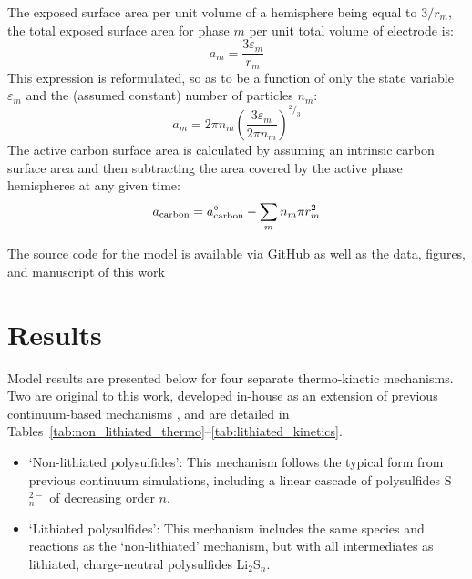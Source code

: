 \documentclass{elsarticle}
\begin{document}
The exposed surface area per unit volume of a hemisphere being equal to $3/r_m$, the total exposed surface area for phase $m$ per unit total volume of electrode is:
\begin{equation}\label{eq:area_per_vol_m_1}
    a_m = \frac{3\varepsilon_m}{r_m}
\end{equation}
This expression is reformulated, so as to be a function of only the state variable $\varepsilon_m$ and the (assumed constant) number of particles $n_m$:
\begin{equation}\label{eq:area_per_vol_m_2}
    a_m = 2\pi n_m\left(\frac{3\varepsilon_m}{2\pi n_m}\right)^{^2/_3}
\end{equation}
The active carbon surface area is calculated by assuming an intrinsic carbon surface area and then subtracting the area covered by the active phase hemispheres at any given time:
\begin{equation}\label{eq:a_carbon}
    a_{\rm carbon} = a^\circ_{\rm carbon} - \sum_m n_m\pi r_m^2
\end{equation}

The source code for the model is available via GitHub \cite{LiSCode} as well as the data, figures, and manuscript of this work \cite{LiSPaper}


\section{Results}
Model results are presented below for four separate thermo-kinetic mechanisms. Two are original to this work, developed in-house as an extension of previous continuum-based mechanisms \cite{Kumaresan_2008, Neidhardt_2012}, and are detailed in Tables~\ref{tab:non_lithiated_thermo}--\ref{tab:lithiated_kinetics}.
\begin{itemize}
    \item `Non-lithiated polysulfides': This mechanism follows the typical form from previous continuum simulations, including a linear cascade of polysulfides S$^{2-}_n$ of decreasing order $n$.
    \item `Lithiated polysulfides': This mechanism includes the same species and reactions as the `non-lithiated' mechanism, but with all intermediates as lithiated, charge-neutral polysulfides Li$_2$S$_n$.
\end{itemize}

\end{document}
